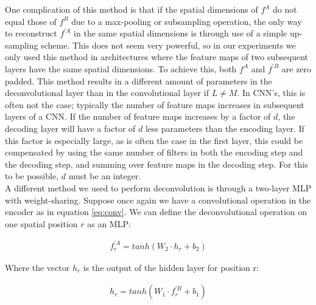 One complication of this method is that if the spatial dimensions of $f^A$ do not equal those of $f^B$ due to a max-pooling or subsampling operation, the only way to reconstruct $f^{\prime A}$ in the same spatial dimensions is through use of a simple up-sampling scheme. This does not seem very powerful, so in our experiments we only used this method in architectures where the feature maps of two subsequent layers have the same spatial dimensions. To achieve this, both $f^A$ and $f^{\prime B}$ are zero padded.
This method results in a different amount of parameters in the deconvolutional layer than in the convolutional layer if $L\neq M$. In CNN's, this is often not the case; typically the number of feature maps increases in subsequent layers of a CNN. If the number of feature maps increases by a factor of $d$, the decoding layer will have a factor of $d$ less parameters than the encoding layer. If this factor is especially large, as is often the case in the first layer, this could be compensated by using the same number of filters in both the encoding step and the decoding step, and summing over feature maps in the decoding step. For this to be possible, $d$ must be an integer.
\\
A different method we used to perform deconvolution is through a two-layer MLP with weight-sharing. Suppose once again we have a convolutional operation in the encoder as in equation \ref{eq:conv}. We can define the deconvolutional operation on one spatial position $r$ as an MLP:

\begin{align}
f^{\prime A}_r = tanh(W_2 \cdot h_r + b_2)
\end{align}

Where the vector $h_r$ is the output of the hidden layer for position r:

\begin{align}
h_r = tanh(W_1 \cdot f^{\prime B}_{r} + b_1)
\end{align}


